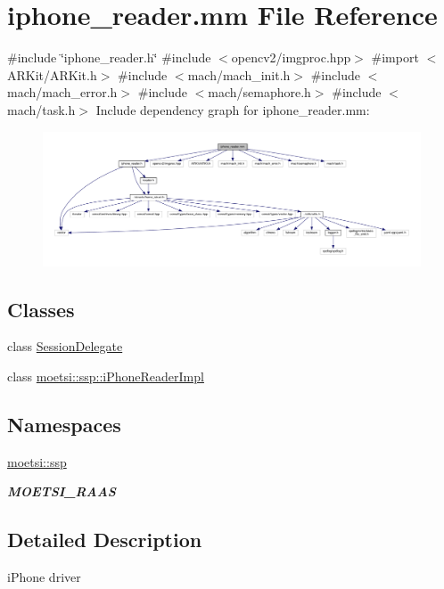 \hypertarget{iphone__reader_8mm}{}\section{iphone\+\_\+reader.\+mm File Reference}
\label{iphone__reader_8mm}
{\ttfamily \#include \char`\"{}iphone\+\_\+reader.\+h\char`\"{}}\newline
{\ttfamily \#include $<$opencv2/imgproc.\+hpp$>$}\newline
{\ttfamily \#import $<$A\+R\+Kit/\+A\+R\+Kit.\+h$>$}\newline
{\ttfamily \#include $<$mach/mach\+\_\+init.\+h$>$}\newline
{\ttfamily \#include $<$mach/mach\+\_\+error.\+h$>$}\newline
{\ttfamily \#include $<$mach/semaphore.\+h$>$}\newline
{\ttfamily \#include $<$mach/task.\+h$>$}\newline
Include dependency graph for iphone\+\_\+reader.\+mm\+:
\nopagebreak
\begin{figure}[H]
\begin{center}
\leavevmode
\includegraphics[width=350pt]{iphone__reader_8mm__incl}
\end{center}
\end{figure}
\subsection*{Classes}
\begin{DoxyCompactItemize}
\item 
class \hyperlink{interfaceSessionDelegate}{Session\+Delegate}
\item 
class \hyperlink{classmoetsi_1_1ssp_1_1iPhoneReaderImpl}{moetsi\+::ssp\+::i\+Phone\+Reader\+Impl}
\end{DoxyCompactItemize}
\subsection*{Namespaces}
\begin{DoxyCompactItemize}
\item 
 \hyperlink{namespacemoetsi_1_1ssp}{moetsi\+::ssp}
\begin{DoxyCompactList}\small\item\em {\bfseries M\+O\+E\+T\+S\+I\+\_\+\+R\+A\+AS} \end{DoxyCompactList}\end{DoxyCompactItemize}


\subsection{Detailed Description}
i\+Phone driver 